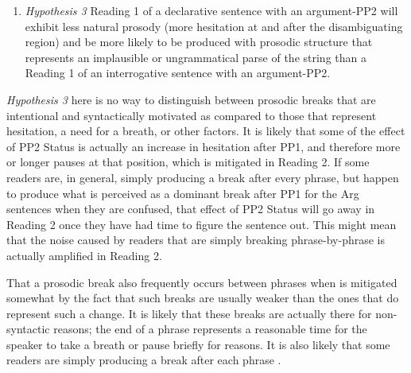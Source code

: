 \documentclass[12pt,oneside]{book}
\providecommand{\tightlist}{%
  \setlength{\itemsep}{0pt}\setlength{\parskip}{0pt}}
\begin{document}
\begin{enumerate}
\def\labelenumi{(\arabic{enumi})}
\setcounter{enumi}{41}
\tightlist
\item
  \emph{Hypothesis 3}
  Reading 1 of a declarative sentence with an argument-PP2 will exhibit less natural prosody (more hesitation at and after the disambiguating region) and be more likely to be produced with prosodic structure that represents an implausible or ungrammatical parse of the string than a Reading 1 of an interrogative sentence with an argument-PP2.
\end{enumerate}

\emph{Hypothesis 3} here is no way to distinguish between prosodic breaks that are intentional and syntactically motivated as compared to those that represent hesitation, a need for a breath, or other factors. It is likely that some of the effect of PP2 Status is actually an increase in hesitation after PP1, and therefore more or longer pauses at that position, which is mitigated in Reading 2. If some readers are, in general, simply producing a break after every phrase, but happen to produce what is perceived as a dominant break after PP1 for the Arg sentences when they are confused, that  effect of PP2 Status will go away in Reading 2 once they have had time to figure the sentence out. This might mean that the noise caused by readers that are simply breaking phrase-by-phrase is actually amplified in Reading 2.

That a prosodic break also frequently occurs between phrases when  is mitigated somewhat by the fact that such breaks are usually weaker than the ones that do represent such a change. It is likely that these breaks are actually there for non-syntactic reasons; the end of a phrase represents a reasonable time for the speaker to take a breath or pause briefly for  reasons. It is also likely that some readers are simply producing a break after each phrase .
\end{document}
